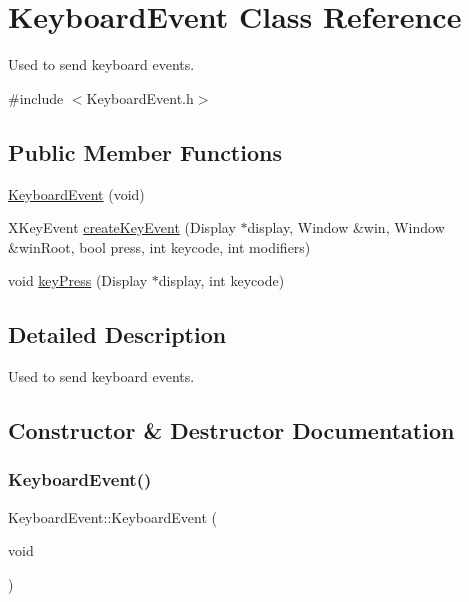 \hypertarget{classKeyboardEvent}{}\section{Keyboard\+Event Class Reference}
\label{classKeyboardEvent}


Used to send keyboard events.  




{\ttfamily \#include $<$Keyboard\+Event.\+h$>$}

\subsection*{Public Member Functions}
\begin{DoxyCompactItemize}
\item 
\hyperlink{classKeyboardEvent_a5a4efca276ce847a471b228c4a114bc7}{Keyboard\+Event} (void)
\item 
X\+Key\+Event \hyperlink{classKeyboardEvent_a84e25f7a086a015007fe877a55d9444e}{create\+Key\+Event} (Display $\ast$display, Window \&win, Window \&win\+Root, bool press, int keycode, int modifiers)
\item 
void \hyperlink{classKeyboardEvent_aea537f2a22fc1f162fd81b5d039eb053}{key\+Press} (Display $\ast$display, int keycode)
\end{DoxyCompactItemize}


\subsection{Detailed Description}
Used to send keyboard events. 

\subsection{Constructor \& Destructor Documentation}
\mbox{\label{classKeyboardEvent_a5a4efca276ce847a471b228c4a114bc7}} 
\subsubsection{\texorpdfstring{Keyboard\+Event()}{KeyboardEvent()}}
{\footnotesize\ttfamily Keyboard\+Event\+::\+Keyboard\+Event (\begin{DoxyParamCaption}\item[{void}]{ }\end{DoxyParamCaption})}



